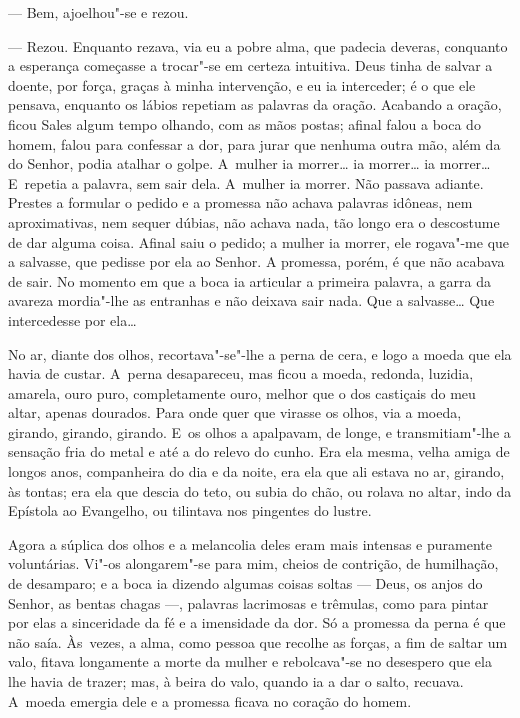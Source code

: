 \begin{linenumbers}
--- Bem, ajoelhou"-se e rezou.

--- Rezou. Enquanto rezava, via eu a pobre alma, que padecia deveras,
conquanto a esperança começasse a trocar"-se em certeza intuitiva. Deus
tinha de salvar a doente, por força, graças à minha intervenção, e eu ia
interceder; é o que ele pensava, enquanto os lábios repetiam as palavras
da oração. Acabando a oração, ficou Sales algum tempo olhando, com as
mãos postas; afinal falou a boca do homem, falou para confessar a dor,
para jurar que nenhuma outra mão, além da do Senhor, podia atalhar o
golpe. A~mulher ia morrer\ldots{} ia morrer\ldots{} ia morrer\ldots{} E~repetia a
palavra, sem sair dela. A~mulher ia morrer. Não passava adiante. Prestes
a formular o pedido e a promessa não achava palavras idôneas, nem
aproximativas, nem sequer dúbias, não achava nada, tão longo era o
descostume de dar alguma coisa. Afinal saiu o pedido; a mulher ia
morrer, ele rogava"-me que a salvasse, que pedisse por ela ao Senhor. A
promessa, porém, é que não acabava de sair. No momento em que a boca ia
articular a primeira palavra, a garra da avareza mordia"-lhe as entranhas
e não deixava sair nada. Que a salvasse\ldots{} Que intercedesse por ela\ldots{}

No ar, diante dos olhos, recortava"-se"-lhe a perna de cera, e logo a
moeda que ela havia de custar. A~perna desapareceu, mas ficou a moeda,
redonda, luzidia, amarela, ouro puro, completamente ouro, melhor que o
dos castiçais do meu altar, apenas dourados. Para onde quer que virasse
os olhos, via a moeda, girando, girando, girando. E~os olhos a
apalpavam, de longe, e transmitiam"-lhe a sensação fria do metal e até a
do relevo do cunho. Era ela mesma, velha amiga de longos anos,
companheira do dia e da noite, era ela que ali estava no ar, girando, às
tontas; era ela que descia do teto, ou subia do chão, ou rolava no
altar, indo da Epístola ao Evangelho, ou tilintava nos pingentes do
lustre.

Agora a súplica dos olhos e a melancolia deles eram mais intensas e
puramente voluntárias. Vi"-os alongarem"-se para mim, cheios de contrição,
de humilhação, de desamparo; e a boca ia dizendo algumas coisas soltas
--- Deus, os anjos do Senhor, as bentas chagas ---, palavras lacrimosas e
trêmulas, como para pintar por elas a sinceridade da fé e a imensidade
da dor. Só a promessa da perna é que não saía. Às~vezes, a alma, como
pessoa que recolhe as forças, a fim de saltar um valo, fitava longamente
a morte da mulher e rebolcava"-se no desespero que ela lhe havia de
trazer; mas, à beira do valo, quando ia a dar o salto, recuava. A~moeda
emergia dele e a promessa ficava no coração do homem.


\end{linenumbers}
